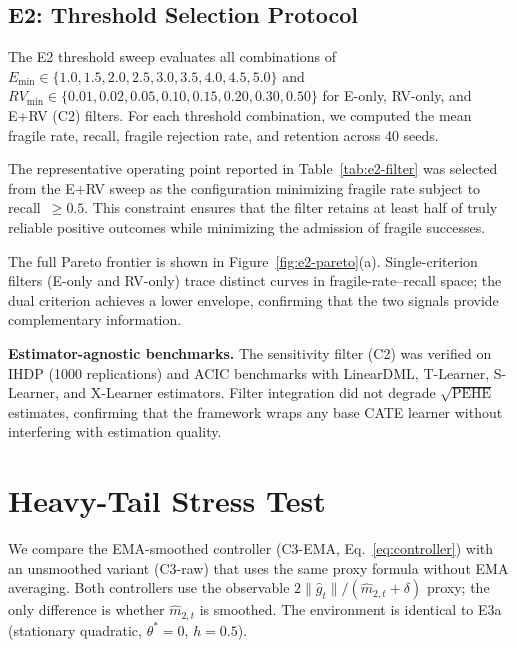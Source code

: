 \documentclass{article}
\begin{document}
\subsection{E2: Threshold Selection Protocol}
\label{sec:e2-supp}\label{sec:e2}
\label{tab:e2-filter}\label{fig:e2-pareto}

The E2 threshold sweep evaluates all combinations of
$E_{\min} \in \{1.0, 1.5, 2.0, 2.5, 3.0, 3.5, 4.0, 4.5, 5.0\}$
and $RV_{\min} \in \{0.01, 0.02, 0.05, 0.10, 0.15, 0.20, 0.30, 0.50\}$
for E-only, RV-only, and E+RV (C2) filters. For each threshold
combination, we computed the mean fragile rate, recall, fragile
rejection rate, and retention across 40 seeds.

The representative operating point reported in
Table~\ref{tab:e2-filter} was selected from the E+RV sweep as the
configuration minimizing fragile rate subject to recall~$\geq 0.5$.
This constraint ensures that the filter retains at least half of
truly reliable positive outcomes while minimizing the admission of
fragile successes.

The full Pareto frontier is shown in
Figure~\ref{fig:e2-pareto}(a). Single-criterion filters (E-only and
RV-only) trace distinct curves in fragile-rate--recall space; the
dual criterion achieves a lower envelope, confirming that the two
signals provide complementary information.

\textbf{Estimator-agnostic benchmarks.}
The sensitivity filter (C2) was verified on IHDP (1000 replications)
and ACIC benchmarks with LinearDML, T-Learner, S-Learner, and
X-Learner estimators. Filter integration did not degrade
$\sqrt{\mathrm{PEHE}}$ estimates, confirming that the framework wraps
any base CATE learner without interfering with estimation quality.


\section{Heavy-Tail Stress Test}
\label{sec:e3b-app}\label{sec:e3b}

We compare the EMA-smoothed controller (C3-EMA, Eq.~\ref{eq:controller})
with an unsmoothed variant (C3-raw) that uses the same proxy formula
without EMA averaging. Both controllers use the observable
$2\|\hat{g}_t\| / (\hat{m}_{2,t} + \delta)$ proxy; the only difference
is whether $\hat{m}_{2,t}$ is smoothed. The environment is identical
to E3a (stationary quadratic, $\theta^*{=}0$, $h{=}0.5$).
\end{document}
